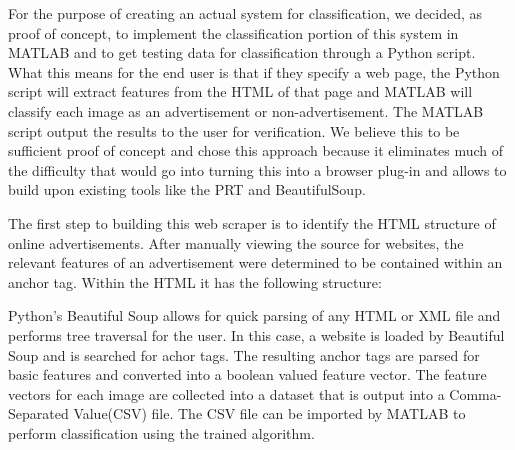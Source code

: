 For the purpose of creating an actual system for classification, we decided, as proof of concept, to implement the classification portion of this system in MATLAB and to get testing data for classification through a Python script. What this means for the end user is that if they specify a web page, the Python script will extract features from the HTML of that page and MATLAB will classify each image as an advertisement or non-advertisement. The MATLAB script output the results to the user for verification. We believe this to be sufficient proof of concept and chose this approach because it eliminates much of the difficulty that would go into turning this into a browser plug-in and allows to build upon existing tools like the PRT and BeautifulSoup.

The first step to building this web scraper is to identify the HTML structure of online advertisements. After manually viewing the source for websites, the relevant features of an advertisement were determined to be contained within an anchor tag. Within the HTML it has the following structure:

 

Python's Beautiful Soup allows for quick parsing of any HTML or XML file and performs tree traversal for the user. In this case, a website is loaded by Beautiful Soup and is searched for achor tags. The resulting anchor tags are parsed for basic features and converted into a boolean valued feature vector. The feature vectors for each image are collected into a dataset that is output into a Comma-Separated Value(CSV) file. The CSV file can be imported  by MATLAB to perform classification using the trained algorithm. 


